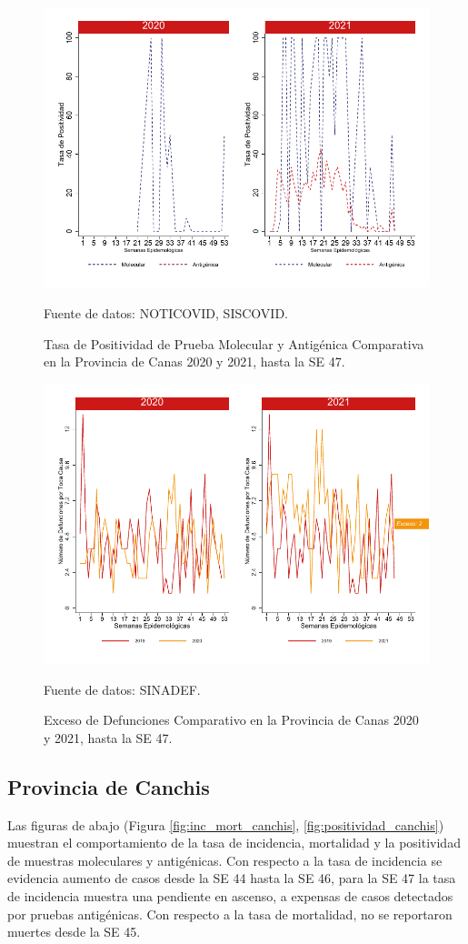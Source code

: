 \documentclass[12pt,a4paper,openany]{book}
\begin{document}
		\begin{figure}[h]
			\caption{Tasa de Positividad de Prueba Molecular y Antigénica Comparativa en la Provincia de Canas 2020 y 2021, hasta la SE 47.}\label{fig:positividad_calca}
			\begin{center}
				\includegraphics[width=0.7\linewidth]{../figuras/positividad_20_21_4}
			\end{center}
			{\footnotesize {Fuente de datos: NOTICOVID, SISCOVID.}}
		\end{figure}
		
		\begin{figure}[h]
			\caption{Exceso de Defunciones Comparativo en la Provincia de Canas 2020 y 2021, hasta la SE 47.}\label{fig:exceso_calca}
			\begin{center}
				\includegraphics[width=0.7\linewidth]{../figuras/exceso_4}
			\end{center}
			{\footnotesize {Fuente de datos: SINADEF.}}
		\end{figure}
		
		\clearpage
		
		\subsection*{Provincia de Canchis}
		\noindent Las figuras de abajo (Figura \ref{fig:inc_mort_canchis}, \ref{fig:positividad_canchis}) muestran el comportamiento de la tasa de incidencia, mortalidad y la positividad de muestras moleculares y antigénicas. Con respecto a la tasa de incidencia se evidencia aumento de casos desde la SE 44 hasta la SE 46, para la SE 47 la tasa de incidencia muestra una pendiente en ascenso, a expensas de casos detectados por pruebas antigénicas. Con respecto a la tasa de mortalidad, no se reportaron muertes desde la SE 45. 
		
\end{document}
